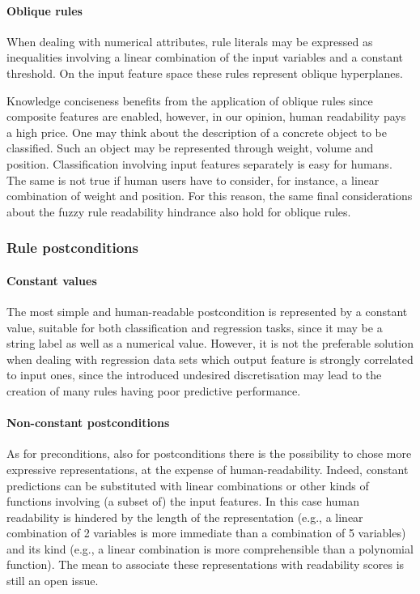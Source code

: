 \documentclass[sigconf]{acmart}
\begin{document}
\paragraph{Oblique rules}

When dealing with numerical attributes, rule literals may be expressed as inequalities involving a linear combination of the input variables and a constant threshold.
%
On the input feature space these rules represent oblique hyperplanes.

Knowledge conciseness benefits from the application of oblique rules since composite features are enabled, however, in our opinion, human readability pays a high price.
%
One may think about the description of a concrete object to be classified.
%
Such an object may be represented through weight, volume and position.
%
Classification involving input features separately is easy for humans.
%
The same is not true if human users have to consider, for instance, a linear combination of weight and position.
%
For this reason, the same final considerations about the fuzzy rule readability hindrance also hold for oblique rules.

\subsubsection{Rule postconditions}

\paragraph{Constant values}

The most simple and human-readable postcondition is represented by a constant value, suitable for both classification and regression tasks, since it may be a string label as well as a numerical value.
%
However, it is not the preferable solution when dealing with regression data sets which output feature is strongly correlated to input ones, since the introduced undesired discretisation may lead to the creation of many rules having poor predictive performance.

\paragraph{Non-constant postconditions}

As for preconditions, also for postconditions there is the possibility to chose more expressive representations, at the expense of human-readability.
%
Indeed, constant predictions can be substituted with linear combinations or other kinds of functions involving (a subset of) the input features.
%
In this case human readability is hindered by the length of the representation (e.g., a linear combination of 2 variables is more immediate than a combination of 5 variables) and its kind (e.g., a linear combination is more comprehensible than a polynomial function).
%
The mean to associate these representations with readability scores is still an open issue.
\end{document}
